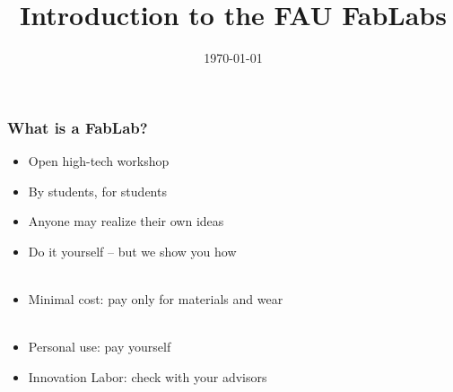 \documentclass[t]{beamer}
\begin{document}


\date{\today}
\title[Vorstellung]{Introduction to the FAU FabLabs}
\author{} %
\frame[plain,c]{\titlepage} %




\begin{frame}
    \frametitle{What is a FabLab?}
    \begin{itemize}
        \item Open high-tech workshop
        \item By students, for students
        \item Anyone may realize their own ideas
        \item Do it yourself -- but we show you how\\~
        \item Minimal cost: pay only for materials and wear\\~
        \item Personal use: pay yourself
        \item Innovation Labor: check with your advisors
    \end{itemize}

\end{frame}
\end{document}
